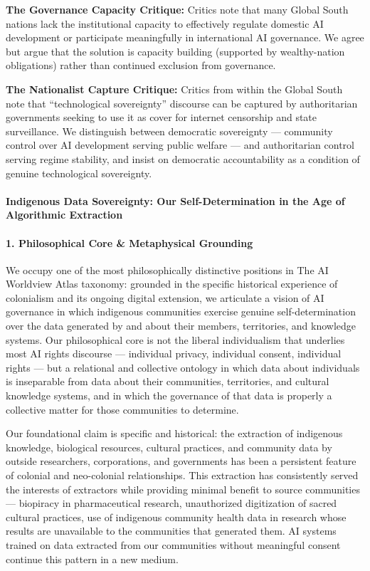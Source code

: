 \textbf{The Governance Capacity Critique:} Critics note that many Global
South nations lack the institutional capacity to effectively regulate
domestic AI development or participate meaningfully in international AI
governance. We agree but argue that the solution is capacity building
(supported by wealthy-nation obligations) rather than continued
exclusion from governance.

\textbf{The Nationalist Capture Critique:} Critics from within the
Global South note that ``technological sovereignty'' discourse can be
captured by authoritarian governments seeking to use it as cover for
internet censorship and state surveillance. We distinguish between
democratic sovereignty --- community control over AI development serving
public welfare --- and authoritarian control serving regime stability,
and insist on democratic accountability as a condition of genuine
technological sovereignty.

\paragraph{Indigenous Data Sovereignty: Our Self-Determination in the
Age of Algorithmic
Extraction}\label{indigenous-data-sovereignty-our-self-determination-in-the-age-of-algorithmic-extraction}

\paragraph{1. Philosophical Core \& Metaphysical
Grounding}\label{philosophical-core-metaphysical-grounding-45}

We occupy one of the most philosophically distinctive positions in The
AI Worldview Atlas taxonomy: grounded in the specific historical
experience of colonialism and its ongoing digital extension, we
articulate a vision of AI governance in which indigenous communities
exercise genuine self-determination over the data generated by and about
their members, territories, and knowledge systems. Our philosophical
core is not the liberal individualism that underlies most AI rights
discourse --- individual privacy, individual consent, individual rights
--- but a relational and collective ontology in which data about
individuals is inseparable from data about their communities,
territories, and cultural knowledge systems, and in which the governance
of that data is properly a collective matter for those communities to
determine.

Our foundational claim is specific and historical: the extraction of
indigenous knowledge, biological resources, cultural practices, and
community data by outside researchers, corporations, and governments has
been a persistent feature of colonial and neo-colonial relationships.
This extraction has consistently served the interests of extractors
while providing minimal benefit to source communities --- biopiracy in
pharmaceutical research, unauthorized digitization of sacred cultural
practices, use of indigenous community health data in research whose
results are unavailable to the communities that generated them. AI
systems trained on data extracted from our communities without
meaningful consent continue this pattern in a new medium.

